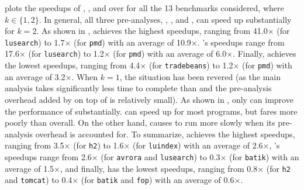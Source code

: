 plots the speedups of , , and  
over  for all the 13 benchmarks considered, where $k \in \{1, 2\}$.
In general, all three pre-analyses, \tool, \selectx, and \zipper, can speed up  substantially for $k = 2$. As shown in ,  achieves the  highest speedups, ranging from 41.0$\times$ (for \texttt{lusearch}) to 1.7$\times$ (for \texttt{pmd}) with an average of 10.9$\times$. 's speedups range from 17.6$\times$ (for \texttt{lusearch}) to 1.2$\times$ (for \texttt{pmd}) with an average of 6.0$\times$. Finally, \tool achieves the lowest speedups, ranging
from 4.4$\times$ (for \texttt{tradebeans}) to 1.2$\times$ (for \texttt{pmd}) with an average of 3.2$\times$. 
When $k = 1$, the situation has been revered (as the main
analysis  takes significantly less time to complete than 
and the pre-analysis overhead added by
\tool on top of  is relatively small). As shown in , only \tool can improve the performance of  substantially. 
\zipper can speed up 
 for most programs, but fares more poorly  than \tool overall. On the other hand, \selectx 
causes  to run more slowly  when its pre-analysis overhead is accounted for. To summarize,   achieves the highest speedups,
ranging from 3.5$\times$ (for \texttt{h2}) to 1.6$\times$ (for \texttt{luindex}) with an average of 2.6$\times$, 's speedups range from 2.6$\times$ (for \texttt{avrora} and \texttt{lusearch}) to 0.3$\times$ (for \texttt{batik}) with an average of 1.5$\times$, and finally,  has the lowest speedups, ranging from 0.8$\times$ (for \texttt{h2} and \texttt{tomcat}) to 0.4$\times$ (for \texttt{batik} and \texttt{fop}) with an average of 0.6$\times$. 

